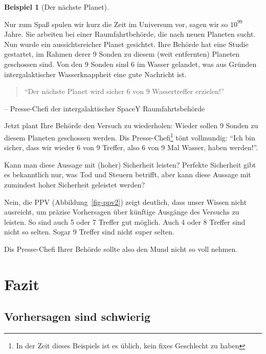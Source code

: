 \documentclass[
  a4paper,
  DIV=11]{scrreprt}
\theoremstyle{definition}
\newtheorem{example}{Beispiel}[chapter]
\theoremstyle{remark}
\begin{document}
\leavevmode{}%
\begin{example}[Der nächste Planet]\label{exm-ppv1}

Nur zum Spaß spulen wir kurz die Zeit im Universum vor, sagen wir so
\(10^{99}\) Jahre. Sie arbeiten bei einer Raumfahrtbehörde, die nach
neuen Planeten sucht. Nun wurde ein aussichtsreicher Planet gesichtet.
Ihre Behörde hat eine Studie gestartet, im Rahmen derer 9 Sonden zu
diesem (weit entfernten) Planeten geschossen sind. Von den 9 Sonden sind
6 im Wasser gelandet, was aus Gründen intergalaktischer Wasserknappheit
eine gute Nachricht ist.

\begin{quote}
``Der nächste Planet wird sicher 6 von 9 Wassertreffer erzielen!''
\end{quote}

-- Presse-Chefi der intergalaktischer SpaceY Raumfahrtsbehörde

Jetzt plant Ihre Behörde den Versuch zu wiederholen: Wieder sollen 9
Sonden zu diesem Planeten geschossen werden. Dis Presse-Chefi\footnote{In
  der Zeit dieses Beispiels ist es üblich, kein fixes Geschlecht zu
  haben} tönt vollmundig: ``Ich bin sicher, dass wir wieder 6 von 9
Treffer, also 6 von 9 Mal Wasser, haben werden!''.

Kann man diese Aussage mit (hoher) Sicherheit leisten? Perfekte
Sicherheit gibt es bekanntlich nur, was Tod und Steuern betrifft, aber
kann diese Aussage mit zumindest hoher Sicherheit geleistet werden?

Nein, die PPV (Abbildung~\ref{fig-ppv2}) zeigt deutlich, dass unser
Wissen nicht ausreicht, um präzise Vorhersagen über künftige Ausgänge
des Versuchs zu leisten. So sind auch 5 oder 7 Treffer gut möglich. Auch
4 oder 8 Treffer sind nicht so selten. Sogar 9 Treffer sind nicht super
selten.

Dis Presse-Chefi Ihrer Behörde sollte also den Mund nicht so voll
nehmen.

\end{example}

\hypertarget{fazit-1}{%
\section{Fazit}\label{fazit-1}}

\hypertarget{vorhersagen-sind-schwierig}{%
\subsection{Vorhersagen sind
schwierig}\label{vorhersagen-sind-schwierig}}
\end{document}
